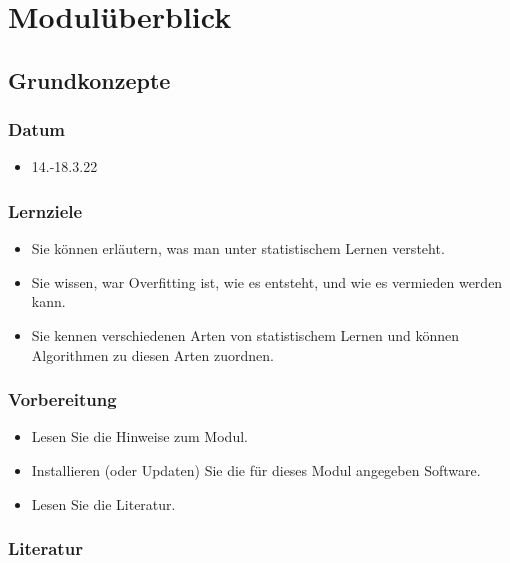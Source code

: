 \documentclass[
]{book}
\providecommand{\tightlist}{%
  \setlength{\itemsep}{0pt}\setlength{\parskip}{0pt}}
\begin{document}
\hypertarget{moduluxfcberblick}{%
\chapter{Modulüberblick}\label{moduluxfcberblick}}

\hypertarget{grundkonzepte}{%
\section{Grundkonzepte}\label{grundkonzepte}}

\hypertarget{datum}{%
\subsection{Datum}\label{datum}}

\begin{itemize}
\tightlist
\item
  14.-18.3.22
\end{itemize}

\hypertarget{lernziele-1}{%
\subsection{Lernziele}\label{lernziele-1}}

\begin{itemize}
\tightlist
\item
  Sie können erläutern, was man unter statistischem Lernen versteht.
\item
  Sie wissen, war Overfitting ist, wie es entsteht, und wie es vermieden werden kann.
\item
  Sie kennen verschiedenen Arten von statistischem Lernen und können Algorithmen zu diesen Arten zuordnen.
\end{itemize}

\hypertarget{vorbereitung}{%
\subsection{Vorbereitung}\label{vorbereitung}}

\begin{itemize}
\tightlist
\item
  Lesen Sie die Hinweise zum Modul.
\item
  Installieren (oder Updaten) Sie die für dieses Modul angegeben Software.
\item
  Lesen Sie die Literatur.
\end{itemize}

\hypertarget{literatur-1}{%
\subsection{Literatur}\label{literatur-1}}
\end{document}
